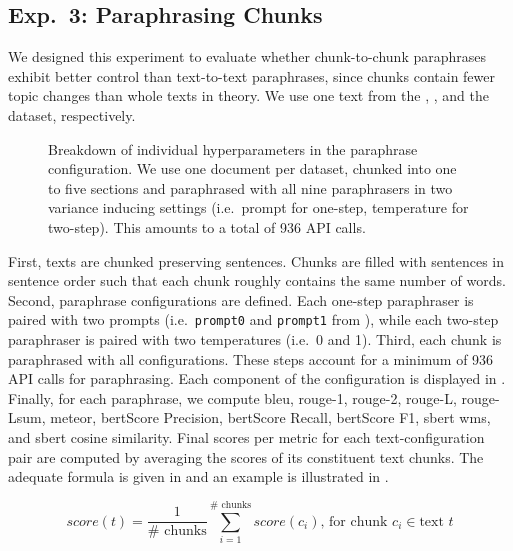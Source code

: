 \subsection{Exp.\ 3: Paraphrasing Chunks}
\label{subsec:paraphrasing_chunks_setup}

We designed this experiment to evaluate whether chunk-to-chunk paraphrases exhibit better control than text-to-text paraphrases, since chunks contain fewer topic changes than whole texts in theory.
We use one text from the \dataBlog{}, \dataGutenberg{}, and the \dataStudent{} dataset, respectively.


\begin{figure}[htbp]
  \centering
  
  \caption[Paraphrase configuration hyperparameters]{Breakdown of individual hyperparameters in the paraphrase configuration.
  We use one document per dataset, chunked into one to five sections and paraphrased with all nine paraphrasers in two variance inducing settings (i.e.\ prompt for one-step, temperature for two-step).
  This amounts to a total of 936 API calls. 
  }
  \label{fig:chunks_api_calls}
\end{figure}


First, texts are chunked preserving sentences.
Chunks are filled with sentences in sentence order such that each chunk roughly contains the same number of words.
Second, paraphrase configurations are defined.
Each one-step paraphraser is paired with two prompts (i.e.\ \texttt{prompt0} and \texttt{prompt1} from ), while each two-step paraphraser is paired with two temperatures (i.e.\ 0 and 1).
Third, each chunk is paraphrased with all configurations.
These steps account for a minimum of 936 API calls for paraphrasing.
Each component of the configuration is displayed in .
Finally, for each paraphrase, we compute \ac{bleu}, \ac{rouge}-1, \ac{rouge}-2, \ac{rouge}-L, \ac{rouge}-Lsum, \ac{meteor}, \ac{bert}\-Score Precision, \ac{bert}\-Score Recall, \ac{bert}\-Score F1, \ac{sbert} \ac{wms}, and \ac{sbert} cosine similarity.
Final scores per metric for each text-configuration pair are computed by averaging the scores of its constituent text chunks.
The adequate formula is given in  and an example is illustrated in .

\begin{equation}
    score(t) = \frac{1}{\#\text{ chunks}}\sum_{i=1}^{\#\text{ chunks}}score(c_i)\text{, for chunk }c_i \in \text{text }t
\label{eq:avg_chunks}
\end{equation}

